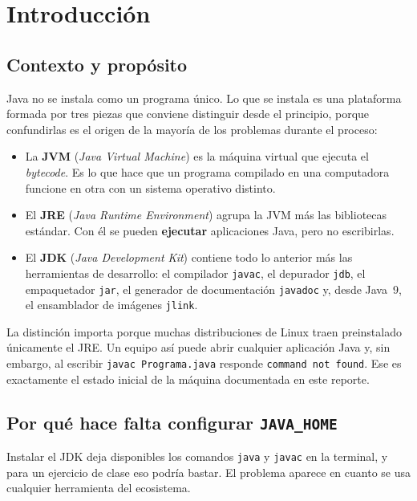 \section{Introducción}

\subsection{Contexto y propósito}

Java no se instala como un programa único. Lo que se instala es una plataforma formada
por tres piezas que conviene distinguir desde el principio, porque confundirlas es el
origen de la mayoría de los problemas durante el proceso:

\begin{itemize}
	\item La \textbf{JVM} (\textit{Java Virtual Machine}) es la máquina virtual que
	ejecuta el \textit{bytecode}. Es lo que hace que un programa compilado en una
	computadora funcione en otra con un sistema operativo distinto.
	\item El \textbf{JRE} (\textit{Java Runtime Environment}) agrupa la JVM más las
	bibliotecas estándar. Con él se pueden \textbf{ejecutar} aplicaciones Java, pero no
	escribirlas.
	\item El \textbf{JDK} (\textit{Java Development Kit}) contiene todo lo anterior más
	las herramientas de desarrollo: el compilador \texttt{javac}, el depurador
	\texttt{jdb}, el empaquetador \texttt{jar}, el generador de documentación
	\texttt{javadoc} y, desde Java~9, el ensamblador de imágenes \texttt{jlink}.
\end{itemize}

La distinción importa porque muchas distribuciones de Linux traen preinstalado
únicamente el JRE. Un equipo así puede abrir cualquier aplicación Java y, sin embargo,
al escribir \texttt{javac Programa.java} responde \texttt{command not found}. Ese es
exactamente el estado inicial de la máquina documentada en este reporte.

\subsection{Por qué hace falta configurar \texttt{JAVA\_HOME}}

Instalar el JDK deja disponibles los comandos \texttt{java} y \texttt{javac} en la
terminal, y para un ejercicio de clase eso podría bastar. El problema aparece en cuanto
se usa cualquier herramienta del ecosistema.

